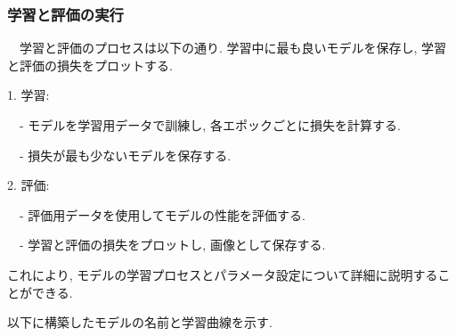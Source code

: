 \documentclass[a4paper, 12pt]{report}
\begin{document}
\subsubsection{学習と評価の実行}
　学習と評価のプロセスは以下の通り. 学習中に最も良いモデルを保存し, 学習と評価の損失をプロットする. 

1. 学習:

　- モデルを学習用データで訓練し, 各エポックごとに損失を計算する. 

　- 損失が最も少ないモデルを保存する. 

2. 評価:

　- 評価用データを使用してモデルの性能を評価する. 

　- 学習と評価の損失をプロットし, 画像として保存する. 

これにより, モデルの学習プロセスとパラメータ設定について詳細に説明することができる. 

以下に構築したモデルの名前と学習曲線を示す. 

\newpage
\end{document}
